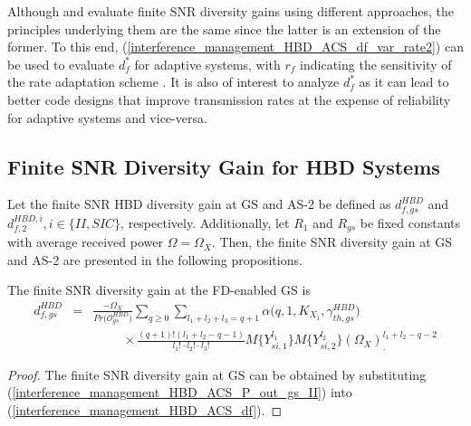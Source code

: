 Although \cite[Eq. (36)]{shin2008diversity} and \cite[Eq. (5)]{narasimhan2006finite} evaluate finite SNR diversity gains using different approaches, the principles underlying them are the same since the latter is an extension of the former. To this end, (\ref{interference_management_HBD_ACS_df_var_rate2}) can be used to evaluate $d_f^*$ for adaptive systems, with $r_f$ indicating the sensitivity of the rate adaptation scheme \cite{narasimhan2006finite}. It is also of interest to analyze $d_f^*$ as it can lead to better code designs that improve transmission rates at the expense of reliability for adaptive systems and vice-versa.

\subsection{Finite SNR Diversity Gain for HBD Systems}
Let the finite SNR HBD diversity gain at GS and AS-2 be defined as $d_{f,gs}^{HBD}$ and $d_{f,2}^{HBD,i}, i \in \{II,SIC\}$, respectively. Additionally, let $R_1$ and $R_{gs}$ be fixed constants with average received power $\Omega = \Omega_X$. Then, the finite SNR diversity gain at GS and AS-2 are presented in the following propositions.

\begin{proposition}
The finite SNR diversity gain at the FD-enabled GS is
\begin{eqnarray} \label{interference_management_HBD_ACS_df_fixed_GS}
d_{f,gs}^{HBD} & = & \frac{-\Omega_X}{Pr\big(\mathcal{O}_{gs}^{HBD}\big)} \sum_{q\geq0}\sum_{l_1+l_2+l_3=q+1} \alpha\big(q,1,K_{X_1},\gamma_{th,gs}^{HBD}\big) \nonumber \\
 & & \hspace{1cm} \times \frac{(q+1)!(l_1+l_2-q-1)}{l_1! \cdot l_2! \cdot l_3!} M\{Y_{si,1}^{l_1}\} M\{Y_{si,2}^{l_2}\}  \left(\Omega_X\right)^{l_1+l_2-q-2}_.
\end{eqnarray}
\end{proposition}
\begin{proof}
The finite SNR diversity gain at GS can be obtained by substituting (\ref{interference_management_HBD_ACS_P_out_gs_II}) into (\ref{interference_management_HBD_ACS_df}).
\end{proof}

